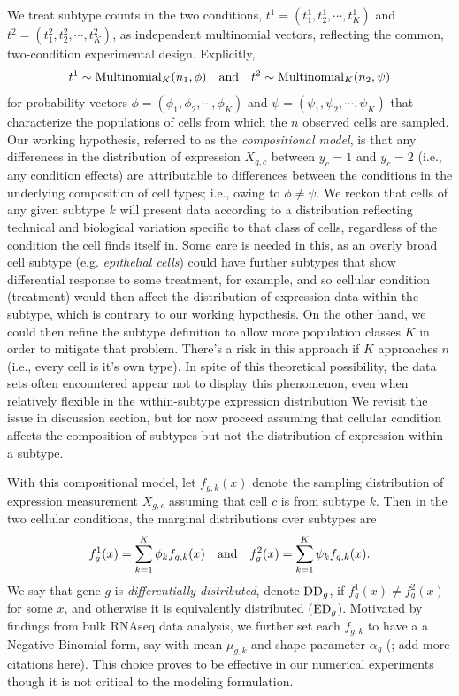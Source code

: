 \documentclass[11pt]{amsart}
\begin{document}
We treat subtype counts in the two conditions,  $t^1 = (t^1_1, t^1_2, \cdots, t^1_K )$ and 
$t^2 = (t^2_1, t^2_2, \cdots, t^2_K)$,  as independent multinomial
vectors, reflecting the common, two-condition experimental design.  Explicitly,
\begin{eqnarray*}
t^1 \sim \text{Multinomial}_K( n_1, \phi ) \quad {\mbox {\rm and}} \quad
t^2 \sim \text{Multinomial}_K( n_2, \psi )
\end{eqnarray*}
for probability vectors 
$\phi = (\phi_1, \phi_2, \cdots, \phi_K)$ and 
 $\psi = ( \psi_1, \psi_2, \cdots, \psi_K)$ that characterize the populations of
cells from which the $n$ observed cells are sampled.  Our working hypothesis, referred to as the {\em compositional model},  is that any differences in the distribution of expression $X_{g,c}$ 
between $y_c=1$ and $y_c=2$ (i.e., any condition effects) are attributable 
to differences between the conditions 
in the underlying composition of cell types; i.e.,
owing to $\phi \neq \psi$.  We reckon that cells of any given subtype $k$ will
present data according to a distribution reflecting technical 
and biological variation specific to that class of cells, regardless of the 
condition the cell finds itself in.   Some care is needed in this, as an overly
broad cell subtype (e.g. {\em epithelial cells}) could have
further subtypes that show differential response to some treatment, for example,
and so cellular condition (treatment) would then affect the distribution of 
expression data within the subtype, which is contrary to our working hypothesis.
On the other hand, we could then refine the subtype definition to allow more
population classes $K$ in order to mitigate that problem. There's a  risk
 in this approach  if $K$ approaches $n$ (i.e., every cell is it's own type).
In spite of this theoretical possibility, the data sets often encountered 
appear not to display this phenomenon,
even when relatively flexible in the within-subtype expression distribution
We revisit the issue in discussion section, but for now proceed assuming 
that cellular condition affects the composition of subtypes but not the distribution of expression
within a subtype.

With this compositional model, let $f_{g,k}(x)$ denote the sampling distribution
of expression measurement $X_{g,c}$ assuming that cell $c$ is from subtype $k$.
Then in the two cellular conditions, the marginal distributions over subtypes are
\begin{eqnarray*}
f_g^1(x) = \sum_{k=1}^K \phi_k f_{g,k} (x) \quad {\mbox {\rm and}} \quad
f_g^2(x) = \sum_{k=1}^K \psi_k f_{g,k} (x).
\end{eqnarray*}
We say that gene $g$ is {\em differentially distributed}, denote ${\rm DD}_g$,
if $f_g^1(x) \neq f_g^2(x)$ for some $x$, and otherwise it is equivalently distributed
(${\rm ED}_g$). Motivated by findings from bulk RNAseq data analysis, we further
set each $f_{g,k}$ to have a a Negative Binomial form, say with mean $\mu_{g,k}$
and shape parameter $\alpha_g$ (\cite{ref:Leng}; add more citations here). 
This choice proves to be effective in our numerical experiments though it is 
not critical to
the modeling formulation.
\end{document}
